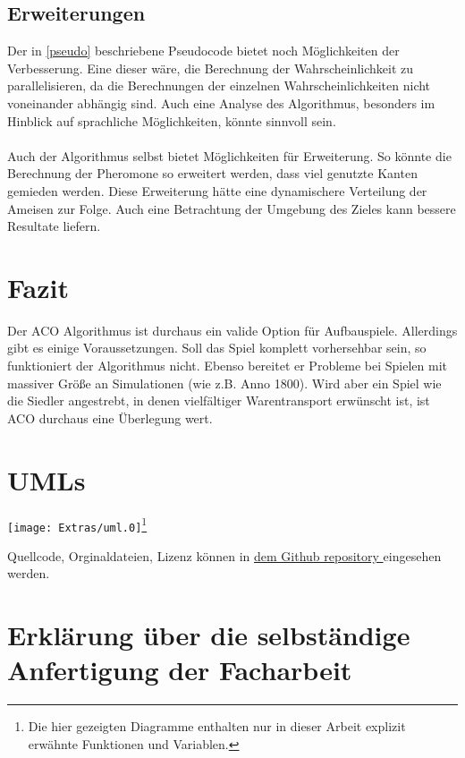 \documentclass[12pt]{article}
\begin{document}
\subsection{Erweiterungen}
Der in \ref{pseudo} beschriebene Pseudocode bietet noch Möglichkeiten der Verbesserung.
Eine dieser wäre, die Berechnung der Wahrscheinlichkeit zu parallelisieren, da die Berechnungen der einzelnen Wahrscheinlichkeiten nicht voneinander abhängig sind. Auch eine Analyse des Algorithmus, besonders im Hinblick auf sprachliche Möglichkeiten, könnte sinnvoll sein.\\\\
Auch der Algorithmus selbst bietet Möglichkeiten für Erweiterung. So könnte die Berechnung der Pheromone so erweitert werden, dass viel genutzte Kanten gemieden werden. Diese Erweiterung hätte eine dynamischere Verteilung der Ameisen zur Folge. Auch eine Betrachtung der Umgebung des Zieles kann bessere Resultate liefern.
\section{Fazit}
Der ACO Algorithmus ist durchaus ein valide Option für Aufbauspiele. Allerdings gibt es einige Voraussetzungen. Soll das Spiel komplett vorhersehbar sein, so funktioniert der Algorithmus nicht. Ebenso bereitet er Probleme bei Spielen mit massiver Größe an Simulationen (wie z.B. Anno 1800).
Wird aber ein Spiel wie die Siedler angestrebt, in denen vielfältiger Warentransport erwünscht ist, ist ACO durchaus eine Überlegung wert.


\section{UMLs}
\begin{center}
\texttt{[image: Extras/uml.0]}\footnote{Die hier gezeigten Diagramme enthalten nur in dieser Arbeit explizit erwähnte Funktionen und Variablen.}
\end{center}
\nocite{*}
\printbibliography[heading=bibnumbered]
Quellcode, Orginaldateien, Lizenz können in \href{https://github.com/Kauruck/Facharbeit_AOC}{dem Github repository } eingesehen werden.

\pagebreak

\section{Erklärung über die selbständige Anfertigung der Facharbeit}
\end{document}
